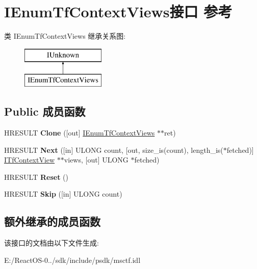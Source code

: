 \hypertarget{interface_i_enum_tf_context_views}{}\section{I\+Enum\+Tf\+Context\+Views接口 参考}
\label{interface_i_enum_tf_context_views}
类 I\+Enum\+Tf\+Context\+Views 继承关系图\+:\begin{figure}[H]
\begin{center}
\leavevmode
\includegraphics[height=2.000000cm]{interface_i_enum_tf_context_views}
\end{center}
\end{figure}
\subsection*{Public 成员函数}
\begin{DoxyCompactItemize}
\item 
\mbox{\label{interface_i_enum_tf_context_views_a3e050782e1d0c6d5305562a020b2e890}} 
H\+R\+E\+S\+U\+LT {\bfseries Clone} (\mbox{[}out\mbox{]} \hyperlink{interface_i_enum_tf_context_views}{I\+Enum\+Tf\+Context\+Views} $\ast$$\ast$ret)
\item 
\mbox{\label{interface_i_enum_tf_context_views_a4f8f433a47373f2a9f59a27fb191656b}} 
H\+R\+E\+S\+U\+LT {\bfseries Next} (\mbox{[}in\mbox{]} U\+L\+O\+NG count, \mbox{[}out, size\+\_\+is(count), length\+\_\+is($\ast$fetched)\mbox{]} \hyperlink{interface_i_tf_context_view}{I\+Tf\+Context\+View} $\ast$$\ast$views, \mbox{[}out\mbox{]} U\+L\+O\+NG $\ast$fetched)
\item 
\mbox{\label{interface_i_enum_tf_context_views_ae1c17ec5113e512d5b24d3a60d9d169b}} 
H\+R\+E\+S\+U\+LT {\bfseries Reset} ()
\item 
\mbox{\label{interface_i_enum_tf_context_views_a132f300c2fc40d4b9fc71f086c2143ac}} 
H\+R\+E\+S\+U\+LT {\bfseries Skip} (\mbox{[}in\mbox{]} U\+L\+O\+NG count)
\end{DoxyCompactItemize}
\subsection*{额外继承的成员函数}


该接口的文档由以下文件生成\+:\begin{DoxyCompactItemize}
\item 
E\+:/\+React\+O\+S-\/0../sdk/include/psdk/msctf.\+idl\end{DoxyCompactItemize}
